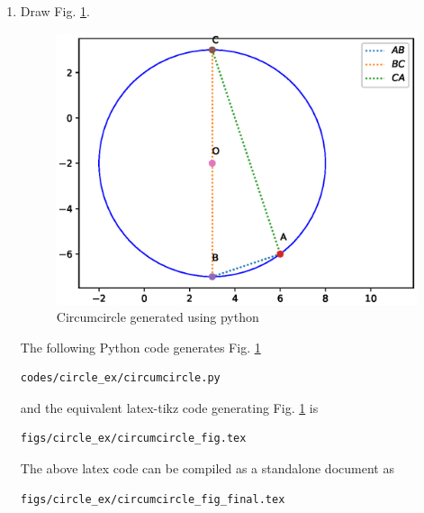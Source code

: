 \begin{enumerate}[label=\thesubsection.\arabic*.,ref=\thesubsection.\theenumi]
\item Draw Fig. \ref{fig:Circumcircle2_circle_ex}.

\begin{figure}[!ht]
\centering
\includegraphics[width=\columnwidth]{./figs/circle_ex/circumcircle.eps}
\caption{Circumcircle generated using python}
\label{fig:Circumcircle2_circle_ex}
\end{figure} 

\solution The  following Python code generates Fig. \ref{fig:Circumcircle2_circle_ex}

\begin{lstlisting}
codes/circle_ex/circumcircle.py
\end{lstlisting}

and the equivalent latex-tikz code generating Fig. \ref{fig:Circumcircle2_circle_ex} is 
\begin{lstlisting}
figs/circle_ex/circumcircle_fig.tex
\end{lstlisting}
%
The above latex code can be compiled as a standalone document as
\begin{lstlisting}
figs/circle_ex/circumcircle_fig_final.tex
\end{lstlisting}
\end{enumerate}

